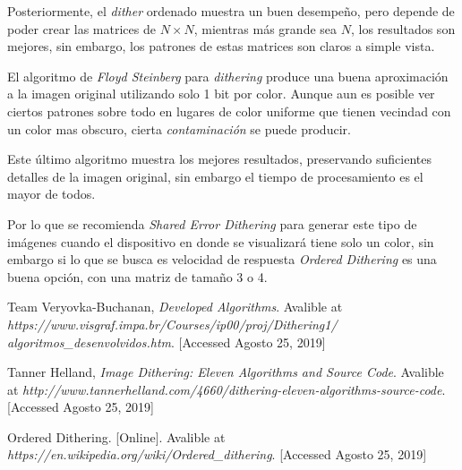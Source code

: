 \documentclass[conference]{IEEEtran}
\begin{document}
Posteriormente, el \textit{dither} ordenado muestra un buen desempeño, pero depende de poder crear las matrices de $N \times N$, mientras más grande sea $N$, los resultados son mejores, sin embargo, los patrones de estas matrices son claros a simple vista.

El algoritmo de \textit{Floyd Steinberg}  para \textit{dithering} produce una buena aproximación a la imagen original utilizando solo 1 bit por color. Aunque aun es posible ver ciertos patrones sobre todo en lugares de color uniforme que tienen vecindad con un color mas obscuro, cierta \textit{contaminación} se puede producir.

Este último algoritmo muestra los mejores resultados, preservando suficientes detalles de la imagen original, sin embargo el tiempo de procesamiento es el mayor de todos.

Por lo que se recomienda \textit{Shared Error Dithering} para generar este tipo de imágenes cuando el dispositivo en donde se visualizará tiene solo un color, sin embargo si lo que se busca es velocidad de respuesta \textit{Ordered Dithering} es una buena opción, con una matriz de tamaño 3 o 4.


\begin{thebibliography}{00}
 Team Veryovka-Buchanan, \textit{Developed Algorithms}. Avalible at \textit{https://www.visgraf.impa.br/Courses/ip00/proj/Dithering1/\\algoritmos\_desenvolvidos.htm}. [Accessed Agosto 25, 2019]

 Tanner Helland, \textit{Image Dithering: Eleven Algorithms and Source Code}. Avalible at \textit{http://www.tannerhelland.com/4660/dithering-eleven-algorithms-source-code}. [Accessed Agosto 25, 2019]

 Ordered Dithering. [Online]. Avalible at \textit{https://en.wikipedia.org/wiki/Ordered\_dithering}. [Accessed Agosto 25, 2019]
\end{thebibliography}


\end{document}
